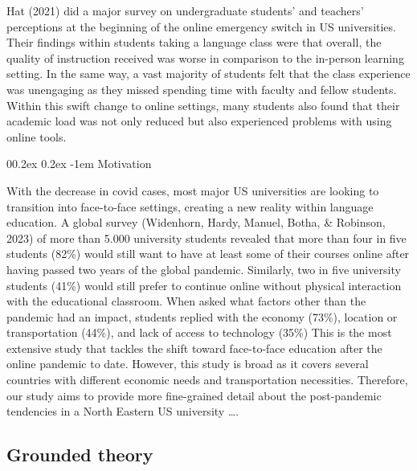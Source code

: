 \documentclass[
  man]{apa6}
\makeatletter
\let\oldparagraph\paragraph
\renewcommand{\paragraph}[1]{\oldparagraph{#1}\mbox{}}
\renewcommand{\paragraph}{\@startsection{paragraph}{4}{\parindent}%
  {0\baselineskip \@plus 0.2ex \@minus 0.2ex}%
  {-1em}%
  {\normalfont\normalsize\bfseries\itshape\typesectitle}}
\makeatother
\begin{document}
Hat (2021) did a major survey on undergraduate students' and teachers' perceptions at the beginning of the online emergency switch in US universities.
Their findings within students taking a language class were that overall, the quality of instruction received was worse in comparison to the in-person learning setting.
In the same way, a vast majority of students felt that the class experience was unengaging as they missed spending time with faculty and fellow students.
Within this swift change to online settings, many students also found that their academic load was not only reduced but also experienced problems with using online tools.

\hypertarget{motivation}{%
\paragraph{Motivation}\label{motivation}}

With the decrease in covid cases, most major US universities are looking to transition into face-to-face settings, creating a new reality within language education.
A global survey (Widenhorn, Hardy, Manuel, Botha, \& Robinson, 2023) of more than 5.000 university students revealed that more than four in five students (82\%) would still want to have at least some of their courses online after having passed two years of the global pandemic.
Similarly, two in five university students (41\%) would still prefer to continue online without physical interaction with the educational classroom.
When asked what factors other than the pandemic had an impact, students replied with the economy (73\%), location or transportation (44\%), and lack of access to technology (35\%)
This is the most extensive study that tackles the shift toward face-to-face education after the online pandemic to date.
However, this study is broad as it covers several countries with different economic needs and transportation necessities.
Therefore, our study aims to provide more fine-grained detail about the post-pandemic tendencies in a North Eastern US university \ldots.

\hypertarget{grounded-theory}{%
\subsection{Grounded theory}\label{grounded-theory}}
\end{document}
